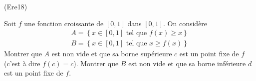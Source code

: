 \begin{tiny}(Ere18)\end{tiny} Soit $f$ une fonction croissante de $[0,1]$ dans $[0,1]$. On considère
\begin{align*}
 A = \left\lbrace x\in[0,1] \text{ tel que } f(x)\geq x \right\rbrace \\
 B = \left\lbrace x\in[0,1] \text{ tel que } x\geq f(x) \right\rbrace 
\end{align*}
Montrer que $A$ est non vide et que sa borne supérieure $c$ est un point fixe de $f$ (c'est à dire $f(c)=c$). Montrer que $B$ est non vide et que sa borne inférieure $d$ est un point fixe de $f$.